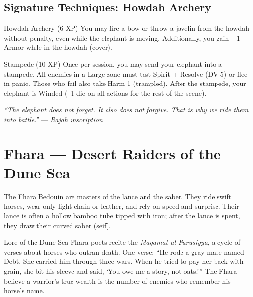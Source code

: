 \documentclass[9pt,a5paper]{extbook}
\begin{document}
\subsection{Signature Techniques: Howdah Archery}

\begin{talentbox}{Howdah Archery (6 XP)}
You may fire a bow or throw a javelin from the howdah without penalty, even while the elephant is moving. Additionally, you gain +1 Armor while in the howdah (cover).
\end{talentbox}

\begin{talentbox}{Stampede (10 XP)}
Once per session, you may send your elephant into a stampede. All enemies in a Large zone must test Spirit + Resolve (DV 5) or flee in panic. Those who fail also take Harm 1 (trampled). After the stampede, your elephant is Winded (--1 die on all actions for the rest of the scene).
\end{talentbox}

\vspace{0.2cm}
\noindent\textit{``The elephant does not forget. It also does not forgive. That is why we ride them into battle.''}  
\hfill --- \textit{Rajah inscription}

\clearpage

\section{Fhara --- Desert Raiders of the Dune Sea}

The Fhara Bedouin are masters of the lance and the saber. They ride swift horses, wear only light chain or leather, and rely on speed and surprise. Their lance is often a hollow bamboo tube tipped with iron; after the lance is spent, they draw their curved saber (seif).

\begin{warriorbox}{Lore of the Dune Sea}
Fhara poets recite the \textit{Maqamat al-Furusiyya}, a cycle of verses about horses who outran death. One verse: ``He rode a gray mare named Debt. She carried him through three wars. When he tried to pay her back with grain, she bit his sleeve and said, `You owe me a story, not oats.''' The Fhara believe a warrior's true wealth is the number of enemies who remember his horse's name.
\end{warriorbox}
\end{document}

